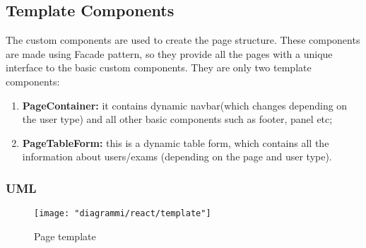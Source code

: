 \documentclass[../react.tex]{subfiles}
\begin{document}
	\subsection{Template Components} The custom components are used to create the page structure. These components are made using Facade pattern, so 
	they provide all the pages with a unique interface to the basic custom components. They are only two template components: \begin{enumerate}
		\item \textbf{PageContainer: } it contains dynamic navbar(which changes depending on the user type) and all other basic components such as footer, panel etc;
		\item \textbf{PageTableForm: }this is a dynamic table form, which contains all the information about users/exams (depending on the page and user type).
	\end{enumerate} 
	\subsubsection{UML}
	\begin{figure}[h]
		\centering
		\texttt{[image: "diagrammi/react/template"]}
		\caption{Page template}
		\label{fig:Page template}
	\end{figure}
	
\end{document}
